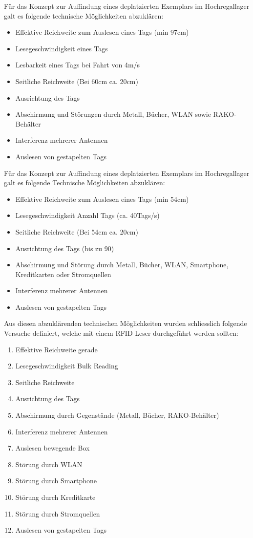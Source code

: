 Für das Konzept zur Auffindung eines deplatzierten Exemplars im Hochregallager galt es folgende technische Möglichkeiten abzuklären:

\begin{itemize}
	\item Effektive Reichweite zum Auslesen eines Tags (min 97cm)
	\item Lesegeschwindigkeit eines Tags
	\item Lesbarkeit eines Tags bei Fahrt von 4m/s
	\item Seitliche Reichweite (Bei 60cm ca. 20cm)
	\item Ausrichtung des Tags
	\item Abschirmung und Störungen durch Metall, Bücher, WLAN sowie RAKO-Behälter
	\item Interferenz mehrerer Antennen
	\item Auslesen von gestapelten Tags
\end{itemize}
Für das Konzept zur Auffindung eines deplatzierten Exemplars im Hochregallager galt es folgende Technische Möglichkeiten abzuklären:
\begin{itemize}
	\item Effektive Reichweite zum Auslesen eines Tags (min 54cm)
	\item Lesegeschwindigkeit Anzahl Tags (ca. 40Tags/s)
	\item Seitliche Reichweite (Bei 54cm ca. 20cm)
	\item Ausrichtung des Tags (bis zu 90\SIUnitSymbolDegree)
	\item Abschirmung und Störung durch Metall, Bücher, WLAN, Smartphone, Kreditkarten oder Stromquellen
	\item Interferenz mehrerer Antennen
	\item Auslesen von gestapelten Tags
\end{itemize}

Aus diesen abzuklärenden technischen Möglichkeiten wurden schliesslich folgende Versuche definiert, welche mit einem RFID Leser durchgeführt werden sollten:
\begin{enumerate}
	\item Effektive Reichweite gerade
	\item Lesegeschwindigkeit Bulk Reading
	\item Seitliche Reichweite
	\item Ausrichtung des Tags
	\item Abschirmung durch Gegenstände (Metall, Bücher, RAKO-Behälter)
	\item Interferenz mehrerer Antennen
	\item Auslesen bewegende Box
	\item Störung durch WLAN
	\item Störung durch Smartphone
	\item Störung durch Kreditkarte
	\item Störung durch Stromquellen
	\item Auslesen von gestapelten Tags
\end{enumerate}

